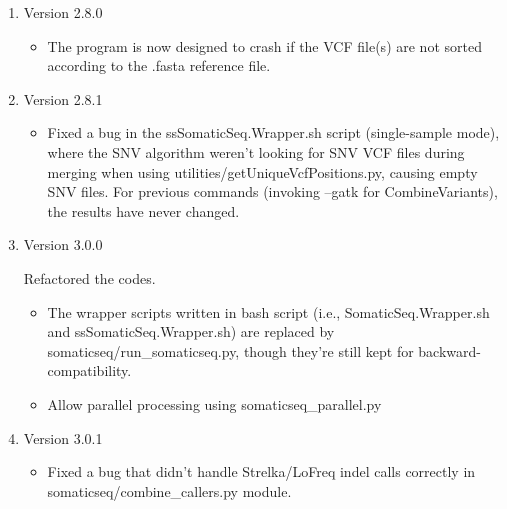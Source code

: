 \documentclass[10pt,letterpaper]{article}
\begin{document}
\begin{sloppypar}
\begin{enumerate}
\begin{itemize}
		\end{itemize}
	
	
	
	\item Version 2.8.0
	
		\begin{itemize}
		
		  \item
		  The program is now designed to crash if the VCF file(s) are not sorted according to the .fasta reference file. 
		  
		\end{itemize}
	
	
	
	\item Version 2.8.1
	
		\begin{itemize}
		
		  \item
		  Fixed a bug in the ssSomaticSeq.Wrapper.sh script (single-sample mode), where the SNV algorithm weren't looking for SNV VCF files during merging when using utilities/getUniqueVcfPositions.py, causing empty SNV files. For previous commands (invoking --gatk for CombineVariants), the results have never changed. 
		  
		\end{itemize}
	
	
	
	\item Version 3.0.0
	
		Refactored the codes.
		  
			\begin{itemize}
		
		     	\item The wrapper scripts written in bash script (i.e., SomaticSeq.Wrapper.sh and ssSomaticSeq.Wrapper.sh) are replaced by somaticseq/run\_somaticseq.py, though they're still kept for backward-compatibility. 
		     
		    	    \item Allow parallel processing using somaticseq\_parallel.py
		
		    \end{itemize}
	
	
	\item Version 3.0.1
		\begin{itemize}
		
		  \item
		  Fixed a bug that didn't handle Strelka/LoFreq indel calls correctly in somaticseq/combine\_callers.py module.
		  

\end{itemize}
\end{enumerate}
\end{sloppypar}
\end{document}
